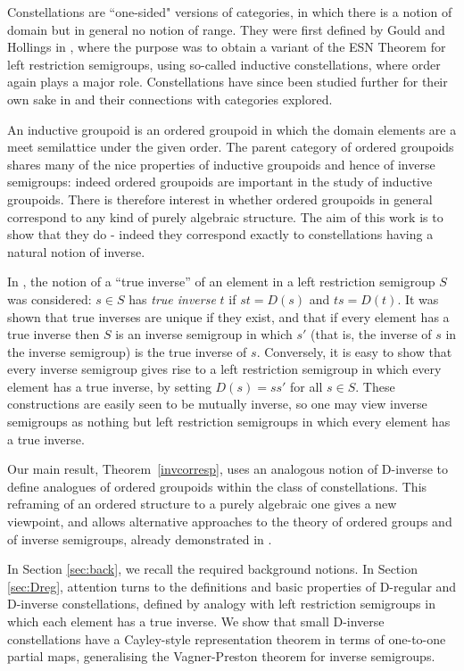 \documentclass[12pt]{amsart}
\theoremstyle{definition}
\begin{document}
Constellations are ``one-sided" versions of categories, in which there is a notion of domain but in general no notion of range.  They were first defined by Gould and Hollings in \cite{constell}, where the purpose was to obtain a variant of the ESN  Theorem for  left restriction semigroups, using so-called inductive constellations, where order again plays a major role. Constellations have since been studied further for their own sake in \cite{constgen,constrange} and their connections with categories explored. 

An inductive groupoid is an ordered groupoid  in which the domain elements are a meet semilattice under the given order.  The parent category of ordered groupoids shares many of the nice properties of inductive groupoids and hence of inverse semigroups:   indeed 
ordered groupoids are important in the  study of inductive groupoids.  There is therefore interest in whether ordered groupoids in general correspond to any kind of purely algebraic structure. The aim of this work is to show that they do - indeed they correspond exactly to constellations having a natural notion of inverse. 

In \cite{csg}, the notion of a ``true inverse'' of an element in a left restriction semigroup $S$ was considered: $s\in S$ has {\em true inverse} $t$ if $st=D(s)$ and $ts=D(t)$.  It was shown that true inverses are unique if they exist, and that if every element has a true inverse then $S$ is an inverse semigroup in which $s'$ (that is, the inverse of $s$ in the  inverse semigroup) is the true inverse of $s$.  Conversely, it is easy to show that every inverse semigroup gives rise to a left restriction semigroup in which every element has a true inverse, by setting $D(s)=ss'$ for all $s\in S$. These constructions are easily seen to be mutually inverse, so one may view inverse semigroups as nothing but left restriction semigroups in which every element has a true inverse.  

Our main result, Theorem~\ref{invcorresp}, uses an analogous notion of D-inverse  to define analogues of ordered groupoids within the class of constellations.  This reframing of an ordered structure to a purely algebraic one gives a new viewpoint, and allows alternative approaches to the theory of ordered groups and of inverse semigroups, already demonstrated in \cite{kaden}.

In Section \ref{sec:back}, we recall the required background notions.  
In Section \ref{sec:Dreg}, attention turns to the definitions and basic properties of D-regular and D-inverse constellations, defined by analogy with left restriction semigroups in which each element has a true inverse.  We show that small D-inverse constellations have a Cayley-style representation theorem in terms of one-to-one partial maps, generalising the Vagner-Preston theorem for inverse semigroups.
\end{document}
